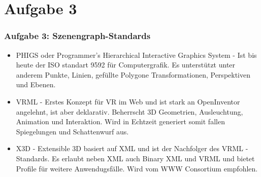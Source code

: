 \documentclass[accentcolor=tud9c,colorbacktitle,inverttitle,landscape,german,presentation,t]{tudbeamer}
\begin{document}
\section{Aufgabe 3}
\begin{frame}
	\frametitle{Aufgabe 3: Szenengraph-Standards}
			\begin{itemize}
			\item PHIGS oder Programmer’s Hierarchical Interactive Graphics System - Ist bis heute der ISO standart 9592 für Computergrafik. Es unterstützt unter anderem Punkte, Linien, gefüllte Polygone Transformationen, Perspektiven und Ebenen.
			\item VRML - Erstes Konzept für VR im Web und ist stark an OpenInventor angelehnt, ist aber deklarativ. Beherrscht 3D Geometrien, Ausleuchtung, Animation und Interaktion. Wird in Echtzeit generiert somit fallen Spiegelungen und Schattenwurf aus.
			\item X3D - Extensible 3D basiert auf XML und ist der Nachfolger des VRML - Standards. Es erlaubt neben XML auch Binary XML und VRML und bietet Profile für weitere Anwendugsfälle. Wird vom WWW Consortium empfohlen.
		\end{itemize}
\end{frame}
\end{document}
